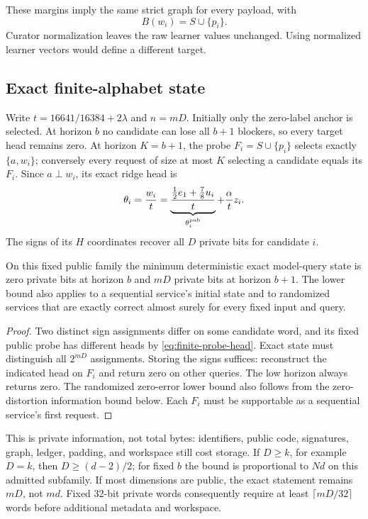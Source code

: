 These margins imply the same strict graph for every payload, with
\[
                          B(w_i)=S\cup\{p_i\}.
\]
Curator normalization leaves the raw learner values unchanged.  Using
normalized learner vectors would define a different target.

\subsection{Exact finite-alphabet state}
Write $t=16641/16384+2\lambda$ and $n=mD$.  Initially only the zero-label
anchor is selected.  At horizon $b$ no candidate can lose all $b+1$
blockers, so every target head remains zero.  At horizon $K=b+1$, the probe
$F_i=S\cup\{p_i\}$ selects exactly $\{a,w_i\}$; conversely every request
of size at most $K$ selecting a candidate equals its $F_i$.
Since $a\perp w_i$, its exact ridge head is
\begin{equation}\label{eq:finite-probe-head}
 \theta_i=\frac{w_i}{t}
   =\underbrace{\frac{\tfrac12e_1+\tfrac78u_i}{t}}_{\theta_i^{\rm pub}}
                          +\frac\alpha t z_i.
\end{equation}
The signs of its $H$ coordinates recover all $D$ private bits for candidate
$i$.

\begin{theorem}
On this fixed public family the minimum deterministic exact model-query
state is zero private bits at horizon $b$ and $mD$ private bits at horizon
$b+1$.  The lower bound also applies to a sequential service's initial
state and to randomized services that are exactly correct almost surely
for every fixed input and query.
\end{theorem}
\begin{proof}
Two distinct sign assignments differ on some candidate word, and its fixed
public probe has different heads by \eqref{eq:finite-probe-head}.  Exact
state must distinguish all $2^{mD}$ assignments.  Storing the signs suffices:
reconstruct the indicated head on $F_i$ and return zero on other queries.
The low horizon always returns zero.  The randomized zero-error lower
bound also follows from the zero-distortion information bound below.
Each $F_i$ must be supportable as a sequential service's first request.
\end{proof}

This is private information, not total bytes: identifiers, public code,
signatures, graph, ledger, padding, and workspace still cost storage.
If $D\ge k$, for example $D=k$, then $D\ge(d-2)/2$; for fixed $b$ the
bound is proportional to $Nd$ on this admitted subfamily.  If most
dimensions are public, the exact statement remains $mD$, not $md$.
Fixed 32-bit private words consequently require at least
$\lceil mD/32\rceil$ words before additional metadata and workspace.

